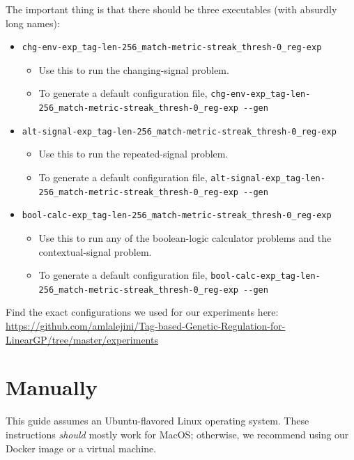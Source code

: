 \documentclass[
]{book}
\providecommand{\tightlist}{%
  \setlength{\itemsep}{0pt}\setlength{\parskip}{0pt}}
\begin{document}
The important thing is that there should be three executables (with absurdly long names):

\begin{itemize}
\tightlist
\item
  \texttt{chg-env-exp\_tag-len-256\_match-metric-streak\_thresh-0\_reg-exp}

  \begin{itemize}
  \tightlist
  \item
    Use this to run the changing-signal problem.
  \item
    To generate a default configuration file, \texttt{chg-env-exp\_tag-len-256\_match-metric-streak\_thresh-0\_reg-exp\ -\/-gen}
  \end{itemize}
\item
  \texttt{alt-signal-exp\_tag-len-256\_match-metric-streak\_thresh-0\_reg-exp}

  \begin{itemize}
  \tightlist
  \item
    Use this to run the repeated-signal problem.
  \item
    To generate a default configuration file, \texttt{alt-signal-exp\_tag-len-256\_match-metric-streak\_thresh-0\_reg-exp\ -\/-gen}
  \end{itemize}
\item
  \texttt{bool-calc-exp\_tag-len-256\_match-metric-streak\_thresh-0\_reg-exp}

  \begin{itemize}
  \tightlist
  \item
    Use this to run any of the boolean-logic calculator problems and the contextual-signal problem.
  \item
    To generate a default configuration file, \texttt{bool-calc-exp\_tag-len-256\_match-metric-streak\_thresh-0\_reg-exp\ -\/-gen}
  \end{itemize}
\end{itemize}

Find the exact configurations we used for our experiments here: \url{https://github.com/amlalejini/Tag-based-Genetic-Regulation-for-LinearGP/tree/master/experiments}

\hypertarget{manually}{%
\section{Manually}\label{manually}}

This guide assumes an Ubuntu-flavored Linux operating system. These instructions \emph{should} mostly work for MacOS; otherwise, we recommend using our Docker image or a virtual machine.
\end{document}
